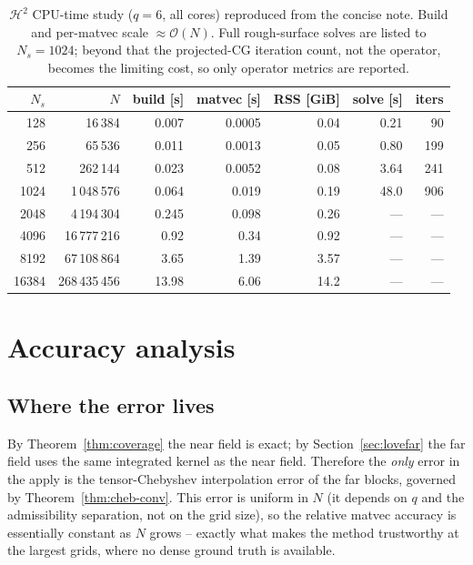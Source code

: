 \documentclass[11pt,a4paper]{article}
\newcommand{\Order}{\mathcal{O}}
\newcommand{\Htwo}{\mathcal{H}^2}
\theoremstyle{definition}
\theoremstyle{remark}
\begin{document}
\begin{table}[h]
\centering
\begin{tabular}{rrrrrrr}
\toprule
$N_s$ & $N$ & build [s] & matvec [s] & RSS [GiB] & solve [s] & iters \\
\midrule
128   & 16\,384       & 0.007 & 0.0005 & 0.04 & 0.21 & 90 \\
256   & 65\,536       & 0.011 & 0.0013 & 0.05 & 0.80 & 199 \\
512   & 262\,144      & 0.023 & 0.0052 & 0.08 & 3.64 & 241 \\
1024  & 1\,048\,576   & 0.064 & 0.019  & 0.19 & 48.0 & 906 \\
2048  & 4\,194\,304   & 0.245 & 0.098  & 0.26 & ---  & --- \\
4096  & 16\,777\,216  & 0.92  & 0.34   & 0.92 & ---  & --- \\
8192  & 67\,108\,864  & 3.65  & 1.39   & 3.57 & ---  & --- \\
16384 & 268\,435\,456 & 13.98 & 6.06   & 14.2 & ---  & --- \\
\bottomrule
\end{tabular}
\caption{$\Htwo$ CPU-time study ($q=6$, all cores) reproduced from the concise
note. Build and per-matvec scale $\approx\Order(N)$. Full rough-surface solves are
listed to $N_s=1024$; beyond that the projected-CG iteration count, not the
operator, becomes the limiting cost, so only operator metrics are reported.}
\label{tab:cputime}
\end{table}

\section{Accuracy analysis}
\label{sec:accuracy}

\subsection{Where the error lives}

By Theorem~\ref{thm:coverage} the near field is exact; by
Section~\ref{sec:lovefar} the far field uses the same integrated kernel as the
near field. Therefore the \emph{only} error in the apply is the tensor-Chebyshev
interpolation error of the far blocks, governed by Theorem~\ref{thm:cheb-conv}.
This error is uniform in $N$ (it depends on $q$ and the admissibility separation,
not on the grid size), so the relative matvec accuracy is essentially constant as
$N$ grows -- exactly what makes the method trustworthy at the largest grids,
where no dense ground truth is available.
\end{document}

